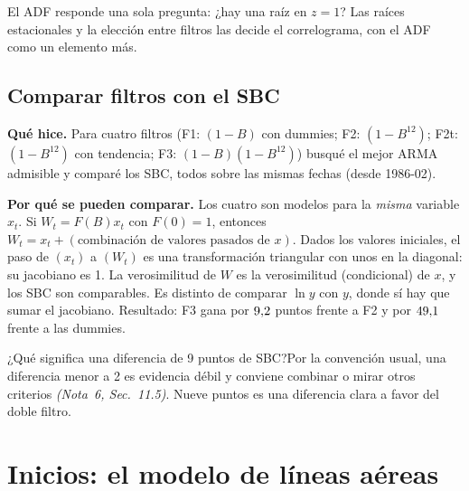 \documentclass[11pt,a4paper]{article}
\newcommand{\nota}[2]{\textit{(Nota~#1, Sec.~#2)}}
\newcommand{\Q}[2]{\begin{pregunta}{#1}#2\end{pregunta}}
\begin{document}
\begin{clave}El ADF responde una sola pregunta: ¿hay una ra\'iz en $z=1$? Las ra\'ices estacionales y la elecci\'on entre filtros las decide el correlograma, con el ADF como un elemento m\'as.\end{clave}

\subsection{Comparar filtros con el SBC}
\textbf{Qu\'e hice.} Para cuatro filtros (F1: $(1-B)$ con dummies; F2: $(1-B^{12})$; F2t: $(1-B^{12})$ con tendencia; F3: $(1-B)(1-B^{12})$) busqu\'e el mejor ARMA admisible y compar\'e los SBC, todos sobre las mismas fechas (desde 1986-02).

\textbf{Por qu\'e se pueden comparar.} Los cuatro son modelos para la \emph{misma} variable $x_t$. Si $W_t=F(B)x_t$ con $F(0)=1$, entonces $W_t=x_t+(\text{combinaci\'on de valores pasados de }x)$. Dados los valores iniciales, el paso de $(x_t)$ a $(W_t)$ es una transformaci\'on triangular con unos en la diagonal: su jacobiano es 1. La verosimilitud de $W$ es la verosimilitud (condicional) de $x$, y los SBC son comparables. Es distinto de comparar $\ln y$ con $y$, donde s\'i hay que sumar el jacobiano. Resultado: F3 gana por $9{,}2$ puntos frente a F2 y por $49{,}1$ frente a las dummies.

\Q{¿Qu\'e significa una diferencia de 9 puntos de SBC?}{Por la convenci\'on usual, una diferencia menor a 2 es evidencia d\'ebil y conviene combinar o mirar otros criterios \nota{6}{11.5}. Nueve puntos es una diferencia clara a favor del doble filtro.}

\section{Inicios: el modelo de l\'ineas a\'ereas}\label{sec:airline}
\end{document}
